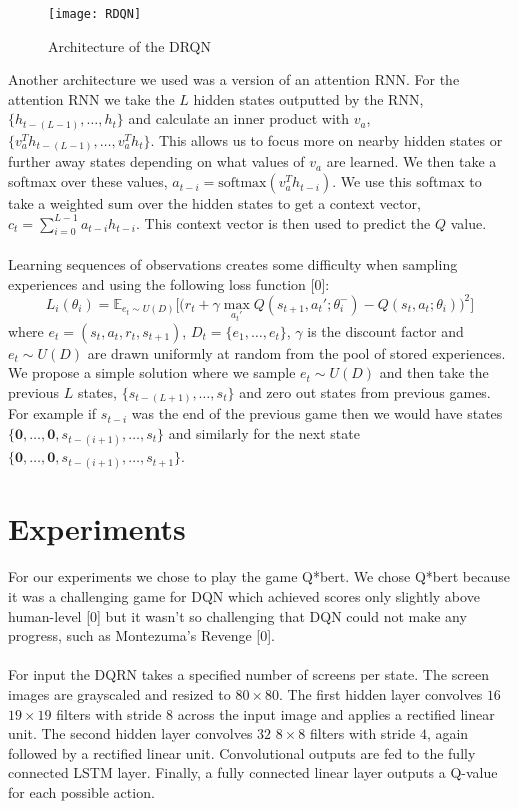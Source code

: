 \documentclass{article}
\begin{document}
\begin{figure}[h]
    \centering
    \texttt{[image: RDQN]}
    \caption{Architecture of the DRQN}
\end{figure}

Another architecture we used was a version of an attention RNN. For the attention
RNN we take the $L$ hidden states outputted by the RNN, $\{h_{t-(L-1)}, \dots, h_{t}\}$
and calculate an inner product with $v_a$, $\{v_a^Th_{t-(L-1)}, \dots, v_a^Th_{t}\}$.
This allows us to focus more on nearby hidden states or further away states depending
on what values of $v_a$ are learned. We then take a softmax over these values,
$a_{t-i} = \text{softmax}(v_a^Th_{t-i})$. We use this softmax to take a weighted
sum over the hidden states to get a context vector, $c_t =
\sum_{i=0}^{L-1}a_{t-i}h_{t-i}$. This context vector is then used to predict the
$Q$ value. \\
\\
Learning sequences of observations creates some difficulty when sampling experiences
and using the following loss function [0]:
$$L_i(\theta_i) = \mathbb{E}_{e_t \sim U(D)}
\Big[\Big(
r_t + \gamma \max_{a_t'}Q(s_{t+1}, a_t'; \theta_i^-) -Q(s_t, a_t; \theta_i)
\Big)^2 \Big]$$
where $e_t = (s_t, a_t, r_t, s_{t+1})$, $D_t = \{e_1, \dots, e_t\}$, $\gamma$
is the discount factor and $e_t \sim U(D)$ are drawn uniformly at random from the
pool of stored experiences. We propose a simple solution where we sample $e_t
\sim U(D)$ and then take the previous $L$ states, $\{s_{t-(L+1)}, \dots, s_t\}$
and zero out states from previous games. For example if $s_{t-i}$ was the end of
the previous game then we would have states $\{\mathbf{0}, \dots, \mathbf{0},
s_{t-(i+1)}, \dots, s_t\}$ and similarly for the next state $\{\mathbf{0}, \dots,
\mathbf{0},s_{t-(i+1)}, \dots, s_{t+1}\}$.


\section{Experiments}
For our experiments we chose to play the game Q*bert. We chose Q*bert because it
was a challenging game for DQN which achieved scores only slightly above human-level
[0] but it wasn't so challenging that DQN could not make any progress, such as
Montezuma's Revenge [0]. \\
\\
For input the DQRN takes a specified number of screens per state. The screen images
are grayscaled and resized to $80 \times 80$. The first hidden layer convolves $16$
$19 \times 19$ filters with stride 8 across the input image and applies a rectified
linear unit.  The second hidden layer convolves $32$ $8 \times 8$ filters with
stride $4$, again followed by a rectified linear unit.  Convolutional outputs are
fed to the fully connected LSTM layer.  Finally, a fully connected linear layer
outputs a Q-value for each possible action. \\
\\
\end{document}
